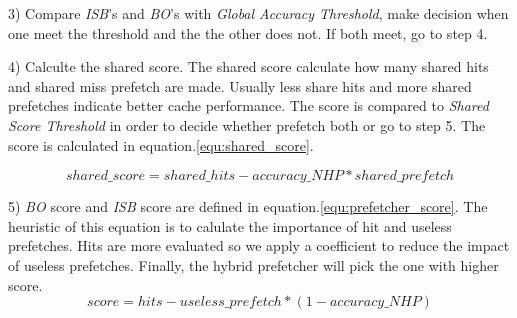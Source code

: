   3) Compare \emph{ISB}'s and \emph{BO}'s with \emph{Global Accuracy Threshold}, make decision when one meet the threshold and the the other does not. If both meet, go to step 4.

  4) Calculte the shared score. The shared score calculate how many shared hits and shared miss prefetch are made. Usually less share hits and more shared prefetches indicate better cache performance. The score is compared to \emph{Shared Score Threshold} in order to decide whether prefetch both or go to step 5. The score is calculated in equation.\ref{equ:shared_score}.

  \begin{equation}
  \label{equ:shared_score}
  shared\_score = shared\_hits - accuracy\_NHP * shared\_prefetch
  \end{equation}

  5) \emph{BO} score and \emph{ISB} score are defined in equation.\ref{equ:prefetcher_score}. The heuristic of this equation is to calulate the importance of hit and useless prefetches. Hits are more evaluated so we apply a coefficient to reduce the impact of useless prefetches. Finally, the hybrid prefetcher will pick the one with higher score.
  \begin{equation}
  \label{equ:prefetcher_score}
  score = hits - useless\_prefetch * (1 - accuracy\_NHP)
  \end{equation}

